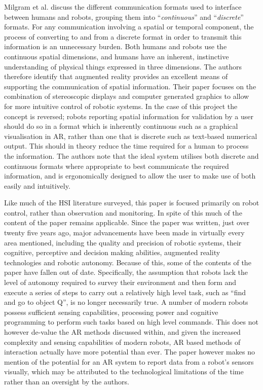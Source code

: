 Milgram et al. \cite{Milgram:1993} discuss the different communication formats used to interface between humans and robots, grouping them into ``\textit{continuous}'' and ``\textit{discrete}'' formats. For any communication involving a spatial or temporal component, the process of converting to and from a discrete format in order to transmit this information is an unnecessary burden. Both humans and robots use the continuous spatial dimensions, and humans have an inherent, instinctive understanding of physical things expressed in three dimensions. The authors \cite{Milgram:1993} therefore identify that  augmented reality provides an excellent means of supporting the communication of spatial information. Their paper focuses on the combination of stereoscopic displays and computer generated graphics to allow for more intuitive control of robotic systems. In the case of this project the concept is reversed; robots reporting spatial information for validation by a user should do so in a format which is inherently continuous such as a graphical visualisation in AR, rather than one that is discrete such as text-based numerical output. This should in theory reduce the time required for a human to process the information. The authors note \cite{Milgram:1993} that the ideal system utilises both discrete and continuous formats where appropriate to best communicate the required information, and is ergonomically designed to allow the user to make use of both easily and intuitively.

Like much of the HSI literature surveyed, this paper \cite{Milgram:1993} is focused primarily on robot control, rather than observation and monitoring. In spite of this much of the content of the paper remains applicable. Since the paper was written, just over twenty five years ago, major advancements have been made in virtually every area mentioned, including the quality and precision of robotic systems, their cognitive, perceptive and decision making abilities, augmented reality technologies and robotic autonomy. Because of this, some of the contents of the paper have fallen out of date. Specifically, the assumption that robots lack the level of autonomy required to survey their environment and then form and execute a series of steps to carry out a relatively high level task, such as ``find and go to object Q''\cite{Milgram:1993}, is no longer necessarily true. A number of modern robots possess sufficient sensing capabilities, processing power and cognitive programming to perform such tasks based on high level commands. This does not however de-value the AR methods discussed within, and given the increased complexity and sensing capabilities of modern robots, AR based methods of interaction actually have more potential than ever. The paper however makes no mention of the potential for an AR system to report data from a robot's sensors visually, which may be attributed to the technological limitations of the time rather than an oversight by the authors.

